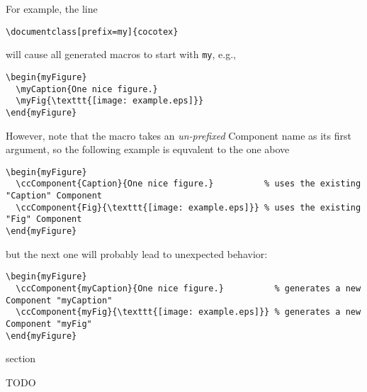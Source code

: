 For example, the line
\begin{lstlisting}
\documentclass[prefix=my]{cocotex}
\end{lstlisting}
will cause all generated macros to start with \texttt{my}, e.g.,
\begin{lstlisting}
\begin{myFigure}
  \myCaption{One nice figure.}
  \myFig{\texttt{[image: example.eps]}}
\end{myFigure}
\end{lstlisting}
However, note that the \UsageMacro{\ccComponent} macro takes an
\textit{un-prefixed} Component name as its first argument, so the
following example is equvalent to the one above
\begin{lstlisting}
\begin{myFigure}
  \ccComponent{Caption}{One nice figure.}          % uses the existing "Caption" Component
  \ccComponent{Fig}{\texttt{[image: example.eps]}} % uses the existing "Fig" Component
\end{myFigure}
\end{lstlisting}
but the next one will probably lead to unexpected behavior:
\begin{lstlisting}
\begin{myFigure}
  \ccComponent{myCaption}{One nice figure.}          % generates a new Component "myCaption"
  \ccComponent{myFig}{\texttt{[image: example.eps]}} % generates a new Component "myFig"
\end{myFigure}
\end{lstlisting}


\begin{Heading}{section}
\end{Heading}

TODO